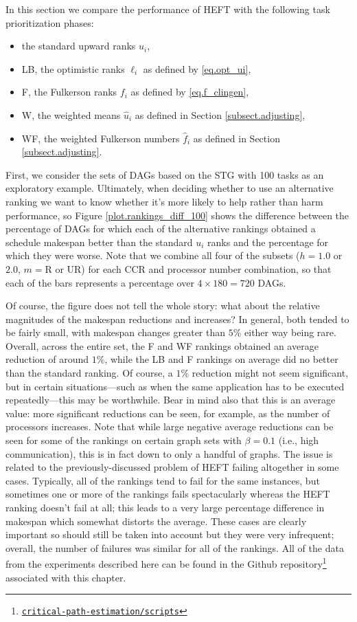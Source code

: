 \documentclass[12pt]{article}
\begin{document}
In this section we compare the performance of HEFT with the following task prioritization phases:
\begin{itemize}
	\item the standard upward ranks $u_i$,
	\item LB, the optimistic ranks $\ell_i$ as defined by \eqref{eq.opt_ui},
	\item F, the Fulkerson ranks $f_i$ as defined by \eqref{eq.f_clingen},
	\item W, the weighted means $\hat{u}_i$ as defined in Section \ref{subsect.adjusting},
	\item WF, the weighted Fulkerson numbers $\hat{f}_i$ as defined in Section \ref{subsect.adjusting}.
\end{itemize}
First, we consider the sets of DAGs based on the STG with 100 tasks as an exploratory example. Ultimately, when deciding whether to use an alternative ranking we want to know whether it's more likely to help rather than harm performance, so Figure \ref{plot.rankings_diff_100} shows the difference between the percentage of DAGs for which each of the alternative rankings obtained a schedule makespan better than the standard $u_i$ ranks and the percentage for which they were worse. Note that we combine all four of the subsets ($h = 1.0$ or $2.0$, $m = \text{R}$ or UR) for each CCR and processor number combination, so that each of the bars represents a percentage over $4 \times 180 = 720$ DAGs. 

Of course, the figure does not tell the whole story: what about the relative magnitudes of the makespan reductions and increases? In general, both tended to be fairly small, with makespan changes greater than $5\%$ either way being rare. Overall, across the entire set, the F and WF rankings obtained an average reduction of around $1\%$, while the LB and F rankings on average did no better than the standard ranking. Of course, a $1\%$ reduction might not seem significant, but in certain situations---such as when the same application has to be executed repeatedly---this may be worthwhile. Bear in mind also that this is an average value: more significant reductions can be seen, for example, as the number of processors increases. Note that while large negative average reductions can be seen for some of the rankings on certain graph sets with $\beta = 0.1$ (i.e., high communication), this is in fact down to only a handful of graphs. The issue is related to the previously-discussed problem of HEFT failing altogether in some cases. Typically, all of the rankings tend to fail for the same instances, but sometimes one or more of the rankings fails spectacularly whereas the HEFT ranking doesn't fail at all; this leads to a very large percentage difference in makespan which somewhat distorts the average. These cases are clearly important so should still be taken into account but they were very infrequent; overall, the number of failures was similar for all of the rankings. All of the data from the experiments described here can be found in the Github repository\footnote{\href{https://github.com/mcsweeney90/critical-path-estimation}{{\tt \small critical-path-estimation/scripts}}} associated with this chapter.    
\end{document}
